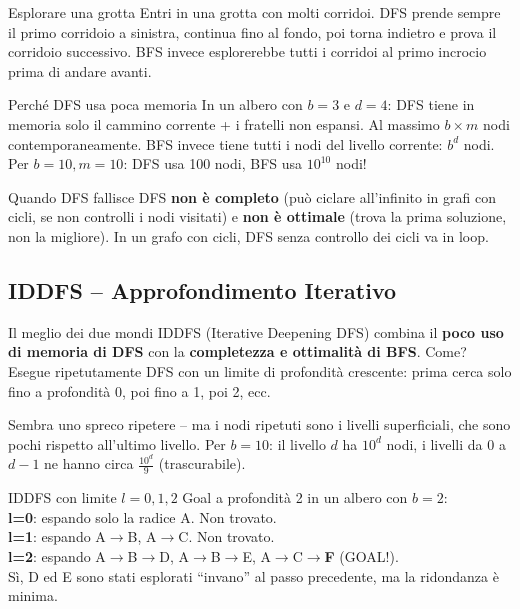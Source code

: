 \documentclass[12pt,a4paper]{article}
\begin{document}
\begin{analogia}{Esplorare una grotta}
Entri in una grotta con molti corridoi. DFS prende sempre il primo corridoio a sinistra, continua fino al fondo, poi torna indietro e prova il corridoio successivo. BFS invece esplorerebbe tutti i corridoi al primo incrocio prima di andare avanti.
\end{analogia}

\begin{esempio}{Perché DFS usa poca memoria}
In un albero con $b=3$ e $d=4$: DFS tiene in memoria solo il cammino corrente + i fratelli non espansi. Al massimo $b \times m$ nodi contemporaneamente. BFS invece tiene tutti i nodi del livello corrente: $b^d$ nodi. Per $b=10, m=10$: DFS usa 100 nodi, BFS usa $10^{10}$ nodi!
\end{esempio}

\begin{attenzione}{Quando DFS fallisce}
DFS \textbf{non è completo} (può ciclare all'infinito in grafi con cicli, se non controlli i nodi visitati) e \textbf{non è ottimale} (trova la prima soluzione, non la migliore). In un grafo con cicli, DFS senza controllo dei cicli va in loop.
\end{attenzione}

\subsection{IDDFS -- Approfondimento Iterativo}

\begin{narrativo}{Il meglio dei due mondi}
IDDFS (Iterative Deepening DFS) combina il \textbf{poco uso di memoria di DFS} con la \textbf{completezza e ottimalità di BFS}. Come? Esegue ripetutamente DFS con un limite di profondità crescente: prima cerca solo fino a profondità 0, poi fino a 1, poi 2, ecc.

Sembra uno spreco ripetere -- ma i nodi ripetuti sono i livelli superficiali, che sono pochi rispetto all'ultimo livello. Per $b=10$: il livello $d$ ha $10^d$ nodi, i livelli da 0 a $d-1$ ne hanno circa $\frac{10^d}{9}$ (trascurabile).
\end{narrativo}

\begin{esempio}{IDDFS con limite $l=0{,}1{,}2$}
Goal a profondità 2 in un albero con $b=2$: \\
\textbf{l=0}: espando solo la radice A. Non trovato.\\
\textbf{l=1}: espando A$\to$B, A$\to$C. Non trovato.\\
\textbf{l=2}: espando A$\to$B$\to$D, A$\to$B$\to$E, A$\to$C$\to$\textbf{F} (GOAL!).\\
Sì, D ed E sono stati esplorati ``invano'' al passo precedente, ma la ridondanza è minima.
\end{esempio}
\end{document}
